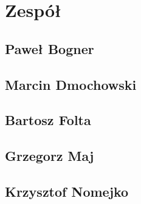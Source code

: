 \documentclass[11pt, a4paper]{article}
\begin{document}
	
	
	

%

	
	
	
	
	



	\section{Zespół}
		\subsection{Paweł Bogner}
			
		\subsection{Marcin Dmochowski}
			
		\subsection{Bartosz Folta}
			
		\subsection{Grzegorz Maj}
			
		\subsection{Krzysztof Nomejko}
			
\end{document}
